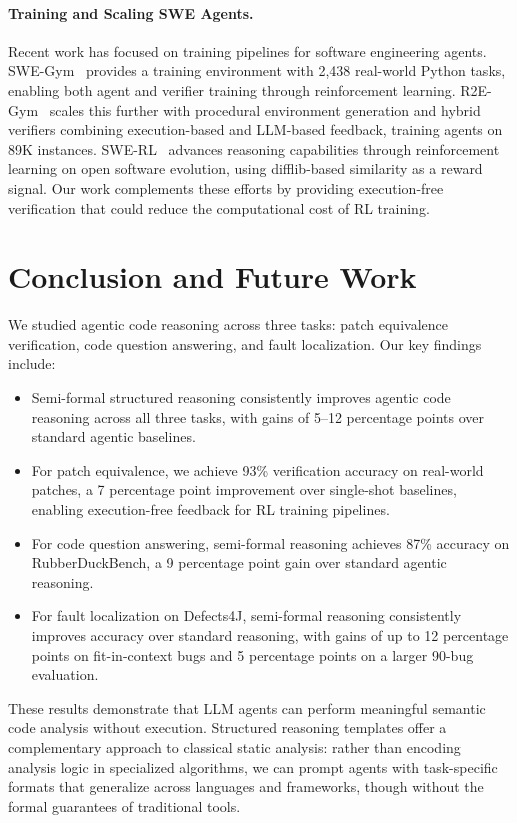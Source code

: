 \documentclass[]{meta}
\begin{document}
\paragraph{Training and Scaling SWE Agents.}
Recent work has focused on training pipelines for software engineering agents.
SWE-Gym~\cite{pan2024swegym} provides a training environment with 2,438 real-world Python tasks, enabling both agent and verifier training through reinforcement learning.
R2E-Gym~\cite{jain2025r2egym} scales this further with procedural environment generation and hybrid verifiers combining execution-based and LLM-based feedback, training agents on 89K instances.
SWE-RL~\cite{wei2025swerl} advances reasoning capabilities through reinforcement learning on open software evolution, using difflib-based similarity as a reward signal.
Our work complements these efforts by providing execution-free verification that could reduce the computational cost of RL training.

\section{Conclusion and Future Work}
We studied agentic code reasoning across three tasks: patch equivalence verification, code question answering, and fault localization. Our key findings include:
\begin{itemize}
    \item Semi-formal structured reasoning consistently improves agentic code reasoning across all three tasks, with gains of 5--12 percentage points over standard agentic baselines.

    \item For patch equivalence, we achieve 93\% verification accuracy on real-world patches, a 7 percentage point improvement over single-shot baselines, enabling execution-free feedback for RL training pipelines.

    \item For code question answering, semi-formal reasoning achieves 87\% accuracy on RubberDuckBench, a 9 percentage point gain over standard agentic reasoning.

    \item For fault localization on Defects4J, semi-formal reasoning consistently improves accuracy over standard reasoning, with gains of up to 12 percentage points on fit-in-context bugs and 5 percentage points on a larger 90-bug evaluation.
\end{itemize}
These results demonstrate that LLM agents can perform meaningful semantic code analysis without execution. Structured reasoning templates offer a complementary approach to classical static analysis: rather than encoding analysis logic in specialized algorithms, we can prompt agents with task-specific formats that generalize across languages and frameworks, though without the formal guarantees of traditional tools.
\end{document}
